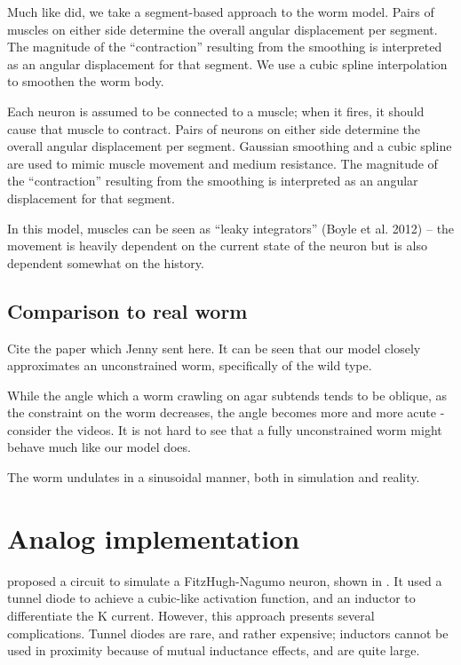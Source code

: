 \documentclass[
    11pt,
]{article}
\begin{document}
Much like \citet{izquierdo2018} did, we take a segment-based approach to the worm model.  Pairs of muscles on either side determine the overall angular displacement per segment.  The magnitude of the “contraction” resulting from the smoothing is interpreted as an angular displacement for that segment.  We use a cubic spline interpolation to smoothen the worm body.

Each neuron is assumed to be connected to a muscle; when it fires, it should cause that muscle to contract.
Pairs of neurons on either side determine the overall angular displacement per segment.
Gaussian smoothing and a cubic spline are used to mimic muscle movement and medium resistance.
The magnitude of the “contraction” resulting from the smoothing is interpreted as an angular displacement for that segment.

In this model, muscles can be seen as “leaky integrators” (Boyle et al. 2012) – the movement is heavily dependent on the current state of the neuron but is also dependent somewhat on the history.


\subsection{Comparison to real worm}

Cite the paper which Jenny sent here.  It can be seen that our model closely approximates an unconstrained worm, specifically of the wild type.

While the angle which a worm crawling on agar subtends tends to be oblique, as the constraint on the worm decreases, the angle becomes more and more acute - consider the videos.  It is not hard to see that a fully unconstrained worm might behave much like our model does.

The worm undulates in a sinusoidal manner, both in simulation and reality.


\section{Analog implementation}

\citet{nagumo1962} proposed a circuit to simulate a FitzHugh-Nagumo neuron, shown in .  It used a tunnel diode to achieve a cubic-like activation function, and an inductor to differentiate the K current.  However, this approach presents several complications.  Tunnel diodes are rare, and rather expensive; inductors cannot be used in proximity because of mutual inductance effects, and are quite large.
\end{document}
